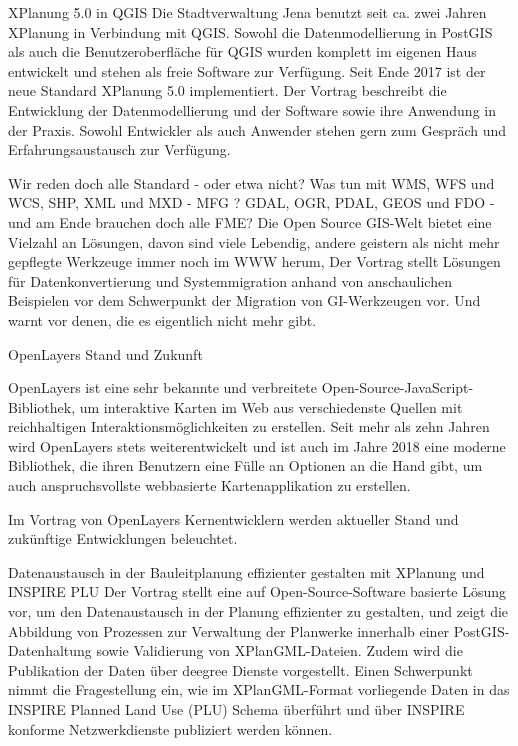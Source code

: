 %
{XPlanung 5.0 in QGIS}%
{}%
{
  Die Stadtverwaltung Jena benutzt seit ca. zwei Jahren XPlanung in Verbindung mit QGIS. Sowohl die Datenmodellierung in PostGIS als auch die Benutzeroberfläche für QGIS wurden komplett im eigenen Haus entwickelt und stehen als freie Software zur Verfügung. Seit Ende 2017 ist der neue Standard XPlanung 5.0 implementiert. Der Vortrag beschreibt die Entwicklung der Datenmodellierung und der Software sowie ihre Anwendung in der Praxis. Sowohl Entwickler als auch Anwender stehen gern zum Gespräch und Erfahrungsaustausch zur Verfügung.%
}


%
{Wir reden doch alle Standard - oder etwa nicht?}%
{Was tun mit WMS, WFS und WCS, SHP, XML und MXD - MFG ?}%
{
  GDAL, OGR, PDAL, GEOS und FDO - und am Ende brauchen doch alle FME?
Die Open Source GIS-Welt bietet eine Vielzahl an Lösungen, davon sind viele Lebendig, andere geistern als nicht mehr gepflegte Werkzeuge immer noch im WWW herum, 
Der Vortrag stellt Lösungen für Datenkonvertierung und Systemmigration anhand von anschaulichen Beispielen vor dem Schwerpunkt der Migration von GI-Werkzeugen vor. Und warnt vor denen, die es eigentlich nicht mehr gibt.%
}

%
{OpenLayers}%
{Stand und Zukunft}%
{
  OpenLayers ist eine sehr bekannte und verbreitete Open-Source-JavaScript-Bibliothek, um interaktive Karten im Web aus verschiedenste Quellen mit reichhaltigen Interaktionsmöglichkeiten zu erstellen. Seit mehr als zehn Jahren wird OpenLayers stets weiterentwickelt und ist auch im Jahre 2018 eine moderne Bibliothek, die ihren Benutzern eine Fülle an Optionen an die Hand gibt, um auch anspruchsvollste webbasierte Kartenapplikation zu erstellen.

Im Vortrag von OpenLayers Kernentwicklern werden aktueller Stand und zukünftige Entwicklungen beleuchtet.%
}

%
{Datenaustausch in der Bauleitplanung effizienter gestalten mit XPlanung und INSPIRE PLU}%
{}%
{
  Der Vortrag stellt eine auf Open-Source-Software basierte Lösung vor, um den Datenaustausch in der Planung effizienter zu gestalten, und zeigt die Abbildung von Prozessen zur Verwaltung der Planwerke innerhalb einer PostGIS-Datenhaltung sowie Validierung von XPlanGML-Dateien. Zudem wird die Publikation der Daten über deegree Dienste vorgestellt.
Einen Schwerpunkt nimmt die Fragestellung ein, wie im XPlanGML-Format vorliegende Daten in das INSPIRE Planned Land Use (PLU) Schema überführt und über INSPIRE konforme Netzwerkdienste publiziert werden können.%
}

